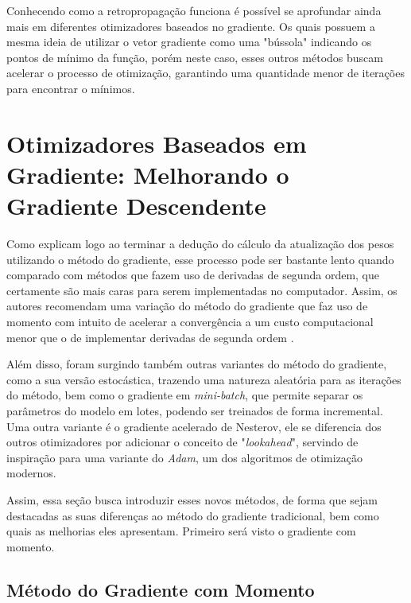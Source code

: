 Conhecendo como a retropropagação funciona é possível se aprofundar ainda mais em diferentes otimizadores baseados no gradiente. Os quais possuem a mesma ideia de utilizar o vetor gradiente como uma "bússola" indicando os pontos de mínimo da função, porém neste caso, esses outros métodos buscam acelerar o processo de otimização, garantindo uma quantidade menor de iterações para encontrar o mínimos.


\section{Otimizadores Baseados em Gradiente: Melhorando o Gradiente Descendente}

Como \textcite{BackpropagationArticle} explicam logo ao terminar a dedução do cálculo da atualização dos pesos utilizando o método do gradiente, esse processo pode ser bastante lento quando comparado com métodos que fazem uso de derivadas de segunda ordem, que certamente são mais caras para serem implementadas no computador. Assim, os autores recomendam uma variação do método do gradiente que faz uso de momento com intuito de acelerar a convergência a um custo computacional menor que o de implementar derivadas de segunda ordem \parencite{BackpropagationArticle}.

Além disso, foram surgindo também outras variantes do método do gradiente, como a sua versão estocástica, trazendo uma natureza aleatória para as iterações do método, bem como o gradiente em \textit{mini-batch}, que permite separar os parâmetros do modelo em lotes, podendo ser treinados de forma incremental. Uma outra variante é o gradiente acelerado de Nesterov, ele se diferencia dos outros otimizadores por adicionar o conceito de "\textit{lookahead}", servindo de inspiração para uma variante do \textit{Adam}, um dos algoritmos de otimização modernos.

Assim, essa seção busca introduzir esses novos métodos, de forma que sejam destacadas as suas diferenças ao método do gradiente tradicional, bem como quais as melhorias eles apresentam. Primeiro será visto o gradiente com momento.

\subsection{Método do Gradiente com Momento}

